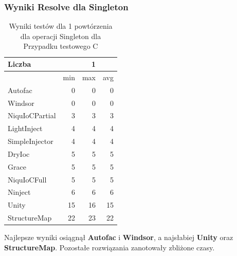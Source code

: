 \documentclass[12pt]{article}
\begin{document}
\subsubsection{Wyniki Resolve dla Singleton}
\begin{table}[H]
\captionsetup{belowskip=0pt,aboveskip=0pt}
\begin{center}
\begin{small}
	\begin{tabular}{ | l | r r r | }
    		\hline
Liczba & & 1 & \\ \hline
 & min & max & avg \\ \hline
Autofac & 0 & 0 & 0 \\ \hline
Windsor & 0 & 0 & 0 \\ \hline
NiquIoCPartial & 3 & 3 & 3 \\ \hline
LightInject & 4 & 4 & 4 \\ \hline
SimpleInjector & 4 & 4 & 4 \\ \hline
DryIoc & 5 & 5 & 5 \\ \hline
Grace & 5 & 5 & 5 \\ \hline
NiquIoCFull & 5 & 5 & 5 \\ \hline
Ninject & 6 & 6 & 6 \\ \hline
Unity & 15 & 16 & 15 \\ \hline
StructureMap & 22 & 23 & 22 \\ \hline
  	\end{tabular}
\end{small}
\end{center}
\caption{Wyniki testów dla 1 powtórzenia dla operacji Singleton dla Przypadku testowego C}
\label{TestCaseC_Singleton1}
\end{table}
Najlepsze wyniki osiągnął \textbf{Autofac} i \textbf{Windsor}, a najsłabiej \textbf{Unity} oraz \textbf{StructureMap}. Pozostałe rozwiązania zanotowały zbliżone czasy.
\\ \\
\end{document}

